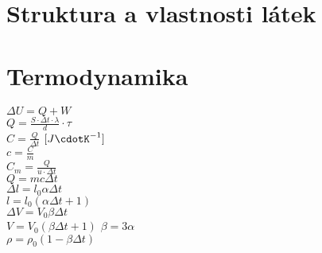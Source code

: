 \documentclass{article}
\begin{document}
\section{Struktura a vlastnosti látek}
\begin{multicols}{2}
\noindent $A_r = \frac{m_a}{u}$\\
$u = 1.66 \cdot 10^{-27} \textrm{ kg}$\\
$M_r = \frac{m_m}{u}$\\
$N_A = 6,022 \cdot 10^{23} \textrm{ mol} ^{-1}$\\
$n = \frac{N}{N_A}$ $[\textrm{mol}]$\\
$M_m = \frac{m}{n}$ $\left[\textrm{kg}\cdot \textrm{mol} ^{-1}}\right]$\\
$M_m = 10^{-3} \cdot M_r$\\
$V_m = \frac{V}{n}$ $\left[\textrm{m}^3\cdot\textrm{mol}^{-1}\right]$\\
$\rho = \frac{M_m}{V_m}$
\end{multicols}

\section{Termodynamika}
\begin{multicols}{2}
\noindent $\Delta U = Q + W$\\
$Q = \frac{S\cdot \Delta t \cdot \lambda}{d}\cdot \tau$\\
$C = \frac{Q}{\Delta t}$ $[J\cdotK^{-1}]$\\
$c = \frac{C}{m}$\\
$C_m = \frac{Q}{u\cdot \Delta t}$\\
$Q = mc\Delta t$\\
$\Delta l = l_0 \alpha \Delta t$\\
$l = l_0(\alpha\Delta t + 1)$\\
$\Delta V = V_0 \beta \Delta t$\\
$V = V_0(\beta\Delta t + 1)$
$\beta = 3\alpha$ \\
$\rho = \rho _0 (1 - \beta \Delta t)$
\end{multicols}
\end{document}
